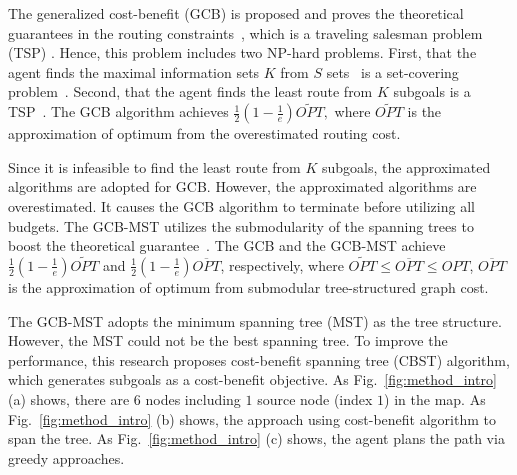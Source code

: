 The generalized cost-benefit (GCB) is proposed and proves the theoretical guarantees in the routing constraints~\cite{zhang2016submodular}, which is a traveling salesman problem (TSP) \cite{flood1956traveling}.
Hence, this problem includes two NP-hard problems.
First, that the agent finds the maximal information sets $K$ from $S$ sets~\cite{nemhauser1978analysis} is a set-covering problem~\cite{grossman1997computational}.
Second, that the agent finds the least route from $K$ subgoals is a TSP~\cite{lin1973effective}.
The GCB algorithm achieves $\frac{1}{2}(1-\frac{1}{e})\widetilde{OPT},$ where $\widetilde{OPT}$ is the approximation of optimum from the overestimated routing cost.

Since it is infeasible to find the least route from $K$ subgoals, the approximated algorithms are adopted for GCB. However, the approximated algorithms are overestimated.
It causes the GCB algorithm to terminate before utilizing all budgets.
The GCB-MST utilizes the submodularity of the spanning trees to boost the theoretical guarantee~\cite{lin2023improvement}.
The GCB and the GCB-MST achieve $\frac{1}{2}(1-\frac{1}{e})\widetilde{OPT}$ and $\frac{1}{2}(1-\frac{1}{e})\overline{OPT}$, respectively, where $\widetilde{OPT} \le \overline{OPT} \le OPT$, $\overline{OPT}$ is the approximation of optimum from submodular tree-structured graph cost.

The GCB-MST adopts the minimum spanning tree (MST) as the tree structure.
However, the MST could not be the best spanning tree.
To improve the performance, this research proposes cost-benefit spanning tree (CBST) algorithm, which generates subgoals as a cost-benefit objective.
As Fig.~\ref{fig:method_intro} (a) shows, there are $6$ nodes including $1$ source node (index $1$) in the map.
As Fig.~\ref{fig:method_intro} (b) shows, the approach using cost-benefit algorithm to span the tree.
As Fig.~\ref{fig:method_intro} (c) shows, the agent plans the path via greedy approaches.

